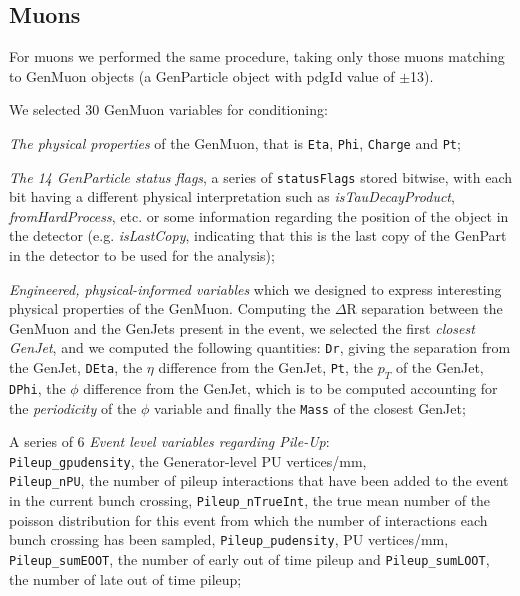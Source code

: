 \subsection{Muons}

For muons we performed the same procedure, taking only those muons matching to GenMuon objects (a GenParticle object with pdgId value of $\pm$13). 

We selected 30 GenMuon variables for conditioning:

\begin{outline}
\1 \emph{The physical properties} of the GenMuon, that is \texttt{Eta}, \texttt{Phi}, \texttt{Charge} and \texttt{Pt};

\1 \emph{The 14 GenParticle status flags}, a series of \texttt{statusFlags} stored bitwise, with each bit having a different physical interpretation such as \emph{isTauDecayProduct}, \emph{fromHardProcess}, etc. or some information regarding the position of the object in the detector (e.g. \emph{isLastCopy}, indicating that this is the last copy of the GenPart in the detector to be used for the analysis);

\1 \emph{Engineered, physical-informed variables} which we designed to express interesting physical properties of the GenMuon. Computing the $\Delta$R separation between the GenMuon and the GenJets present in the event, we selected the first \emph{closest GenJet}, and we computed the following quantities:
\2 \texttt{Dr}, giving the separation from the GenJet, \texttt{DEta}, the $\eta$ difference from the GenJet, \texttt{Pt}, the $p_T$ of the GenJet,
\texttt{DPhi}, the $\phi$ difference from the GenJet, which is to be computed accounting for the \emph{periodicity} of the $\phi$ variable and finally the \texttt{Mass} of the closest GenJet;

\1 A series of 6 \emph{ Event level variables regarding Pile-Up}:\\ \texttt{Pileup\_gpudensity}, the Generator-level PU vertices/mm,\\ \texttt{Pileup\_nPU}, the number of pileup interactions that have been added to the event in the current bunch crossing, \texttt{Pileup\_nTrueInt}, the true mean number of the poisson distribution for this event from which the number of interactions each bunch crossing has been sampled, \texttt{Pileup\_pudensity}, PU vertices/mm, \texttt{Pileup\_sumEOOT}, the number of early out of time pileup and \texttt{Pileup\_sumLOOT}, the number of late out of time pileup;
\end{outline}

